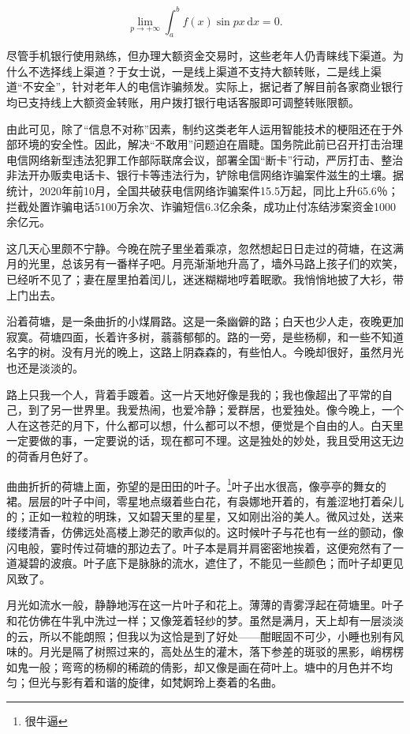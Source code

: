 \documentclass{ecnuthesis}
\begin{document}
\[
  \lim_{p\to+\infty}\int_{a}^{b}f(x)\sin{px}\,\mathrm{d}x = 0.
\]

尽管手机银行使用熟练，但办理大额资金交易时，这些老年人仍青睐线下渠道。为什么不选择线上渠道？于女士说，一是线上渠道不支持大额转账，二是线上渠道“不安全”，针对老年人的电信诈骗频发。实际上，据记者了解目前各家商业银行均已支持线上大额资金转账，用户拨打银行电话客服即可调整转账限额。

由此可见，除了“信息不对称”因素，制约这类老年人运用智能技术的梗阻还在于外部环境的安全性。因此，解决“不敢用”问题迫在眉睫。国务院此前已召开打击治理电信网络新型违法犯罪工作部际联席会议，部署全国“断卡”行动，严厉打击、整治非法开办贩卖电话卡、银行卡等违法行为，铲除电信网络诈骗案件滋生的土壤。据统计，2020年前10月，全国共破获电信网络诈骗案件15.5万起，同比上升65.6％；拦截处置诈骗电话5100万余次、诈骗短信6.3亿余条，成功止付冻结涉案资金1000余亿元。

这几天心里颇不宁静。今晚在院子里坐着乘凉，忽然想起日日走过的荷塘，在这满月的光里，总该另有一番样子吧。月亮渐渐地升高了，墙外马路上孩子们的欢笑，已经听不见了；妻在屋里拍着闰儿，迷迷糊糊地哼着眠歌。我悄悄地披了大衫，带上门出去。

沿着荷塘，是一条曲折的小煤屑路。这是一条幽僻的路；白天也少人走，夜晚更加寂寞。荷塘四面，长着许多树，蓊蓊郁郁的。路的一旁，是些杨柳，和一些不知道名字的树。没有月光的晚上，这路上阴森森的，有些怕人。今晚却很好，虽然月光也还是淡淡的。

路上只我一个人，背着手踱着。这一片天地好像是我的；我也像超出了平常的自己，到了另一世界里。我爱热闹，也爱冷静；爱群居，也爱独处。像今晚上，一个人在这苍茫的月下，什么都可以想，什么都可以不想，便觉是个自由的人。白天里一定要做的事，一定要说的话，现在都可不理。这是独处的妙处，我且受用这无边的荷香月色好了。

曲曲折折的荷塘上面，弥望的是田田的叶子。\footnote{很牛逼}叶子出水很高，像亭亭的舞女的裙。层层的叶子中间，零星地点缀着些白花，有袅娜地开着的，有羞涩地打着朵儿的；正如一粒粒的明珠，又如碧天里的星星，又如刚出浴的美人。微风过处，送来缕缕清香，仿佛远处高楼上渺茫的歌声似的。这时候叶子与花也有一丝的颤动，像闪电般，霎时传过荷塘的那边去了。叶子本是肩并肩密密地挨着，这便宛然有了一道凝碧的波痕。叶子底下是脉脉的流水，遮住了，不能见一些颜色；而叶子却更见风致了。

月光如流水一般，静静地泻在这一片叶子和花上。薄薄的青雾浮起在荷塘里。叶子和花仿佛在牛乳中洗过一样；又像笼着轻纱的梦。虽然是满月，天上却有一层淡淡的云，所以不能朗照；但我以为这恰是到了好处——酣眠固不可少，小睡也别有风味的。月光是隔了树照过来的，高处丛生的灌木，落下参差的斑驳的黑影，峭楞楞如鬼一般；弯弯的杨柳的稀疏的倩影，却又像是画在荷叶上。塘中的月色并不均匀；但光与影有着和谐的旋律，如梵婀玲上奏着的名曲。
\end{document}
